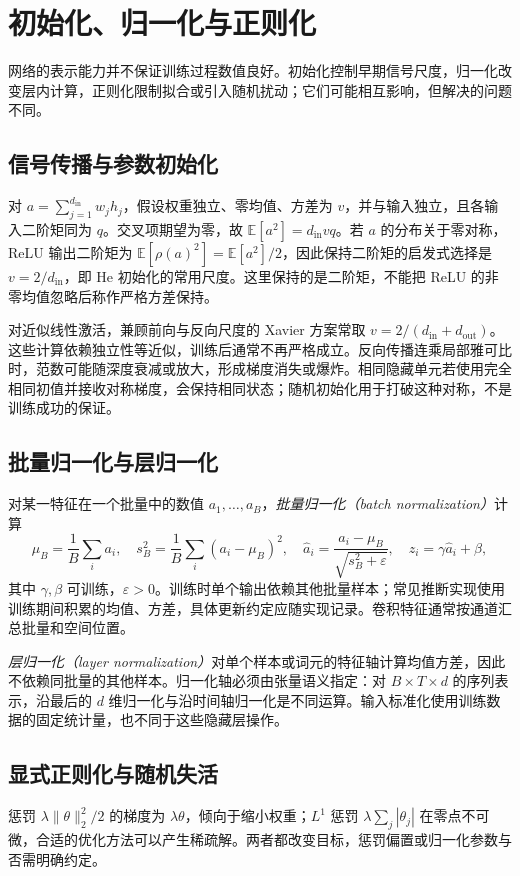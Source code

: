 \setcounter{chapter}{7} %
\chapter{初始化、归一化与正则化}
\label{chap:dl-regularization}
网络的表示能力并不保证训练过程数值良好。初始化控制早期信号尺度，归一化改变层内计算，正则化限制拟合或引入随机扰动；它们可能相互影响，但解决的问题不同。

\section{信号传播与参数初始化}
对 $a=\sum_{j=1}^{d_{\mathrm{in}}}w_jh_j$，假设权重独立、零均值、方差为 $v$，并与输入独立，且各输入二阶矩同为 $q$。交叉项期望为零，故 $\mathbb E[a^2]=d_{\mathrm{in}}vq$。若 $a$ 的分布关于零对称，ReLU 输出二阶矩为 $\mathbb E[\rho(a)^2]=\mathbb E[a^2]/2$，因此保持二阶矩的启发式选择是 $v=2/d_{\mathrm{in}}$，即 He 初始化的常用尺度。这里保持的是二阶矩，不能把 ReLU 的非零均值忽略后称作严格方差保持。

对近似线性激活，兼顾前向与反向尺度的 Xavier 方案常取 $v=2/(d_{\mathrm{in}}+d_{\mathrm{out}})$。这些计算依赖独立性等近似，训练后通常不再严格成立。反向传播连乘局部雅可比时，范数可能随深度衰减或放大，形成梯度消失或爆炸。相同隐藏单元若使用完全相同初值并接收对称梯度，会保持相同状态；随机初始化用于打破这种对称，不是训练成功的保证。

\section{批量归一化与层归一化}
对某一特征在一个批量中的数值 $a_1,\ldots,a_B$，\emph{批量归一化（batch normalization）}计算
\[
\mu_B=\frac1B\sum_i a_i,\quad s_B^2=\frac1B\sum_i(a_i-\mu_B)^2,\quad
\widehat a_i=\frac{a_i-\mu_B}{\sqrt{s_B^2+\varepsilon}},\quad z_i=\gamma\widehat a_i+\beta,
\]
其中 $\gamma,\beta$ 可训练，$\varepsilon>0$。训练时单个输出依赖其他批量样本；常见推断实现使用训练期间积累的均值、方差，具体更新约定应随实现记录。卷积特征通常按通道汇总批量和空间位置。

\emph{层归一化（layer normalization）}对单个样本或词元的特征轴计算均值方差，因此不依赖同批量的其他样本。归一化轴必须由张量语义指定：对 $B\times T\times d$ 的序列表示，沿最后的 $d$ 维归一化与沿时间轴归一化是不同运算。输入标准化使用训练数据的固定统计量，也不同于这些隐藏层操作。

\section{显式正则化与随机失活}
惩罚 $\lambda\|\theta\|_2^2/2$ 的梯度为 $\lambda\theta$，倾向于缩小权重；$L^1$ 惩罚 $\lambda\sum_j|\theta_j|$ 在零点不可微，合适的优化方法可以产生稀疏解。两者都改变目标，惩罚偏置或归一化参数与否需明确约定。

